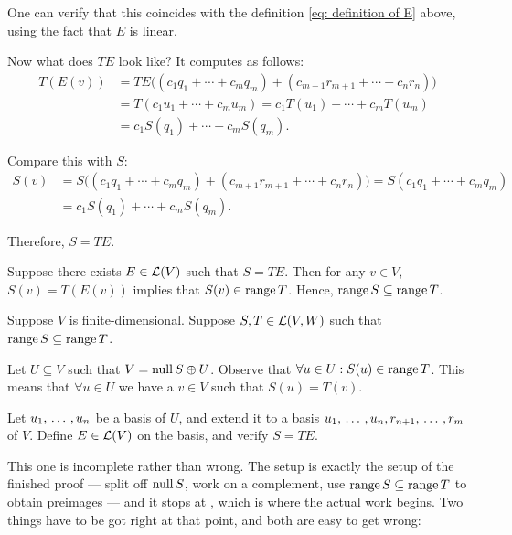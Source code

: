 \begin{xrcs}
\begin{xprf}
    One can verify that this coincides with the definition \eqref{eq: definition of E} above, using the fact that $E$ is linear.

    Now what does $TE$ look like? It computes as follows:
    \begin{equation}
      \begin{aligned}
        T(E(v)) &= TE\Big((c_1 q_1 + \cdots + c_m q_m) + (c_{m+1} r_{m+1} + \cdots + c_n r_n)\Big) \\
        &= T(c_1 u_1 + \cdots + c_m u_m) = c_1 T (u_1) + \cdots + c_m T (u_m) \\
        &= c_1 S (q_1) + \cdots + c_m S (q_m).
      \end{aligned}
    \end{equation}

    Compare this with $S$:
    \begin{equation}
      \begin{aligned}
        S(v) &= S\Big((c_1 q_1 + \cdots + c_m q_m) + (c_{m+1} r_{m+1} + \cdots + c_n r_n)\Big)
        = S(c_1 q_1 + \cdots + c_m q_m) \\
        &= c_1 S (q_1) + \cdots + c_m S (q_m).
      \end{aligned}
    \end{equation}

    Therefore, $S = TE$.

    \Leftarrowdirection Suppose there exists $E \in \mathcal{L} (V)$ such that $S=TE$. Then for any $v \in V$, $S(v) = T(E(v))$ implies that $S(v) \in \operatorname{range} T$. Hence, $\operatorname{range} S \subseteq \operatorname{range} T$.

    \begin{failedattempt}
      \Rightarrowdirection Suppose $V$ is finite-dimensional. Suppose $S, T \in \mathcal{L} (V,W)$ such that $\operatorname{range} S \subseteq \operatorname{range} T$.

      Let $U \subseteq V$ such that $V = \operatorname{null} S \oplus U$. Observe that $\forall u \in U: S(u) \in \operatorname{range} T$.
      This means that $\forall u \in U$ we have a $v \in V$ such that $S(u) = T(v)$.

      Let $u_1, {\, \ldots \,\,}, u_n$ be a basis of $U$, and extend it to a basis $u_1, {\, \ldots \,\,}, u_n, r_{n+1}, {\, \ldots \,\,}, r_m$ of $V$.
      Define $E \in \mathcal{L}(V)$ on the basis, and verify $S=TE$.
    \end{failedattempt}

    \begin{ainote}
      This one is incomplete rather than wrong. The setup is exactly the setup of the finished proof --- split off $\operatorname{null} S$, work on a complement, use $\operatorname{range} S \subseteq \operatorname{range} T$ to obtain preimages --- and it stops at , which is where the actual work begins. Two things have to be got right at that point, and both are easy to get wrong:


\end{ainote}
\end{xprf}
\end{xrcs}
